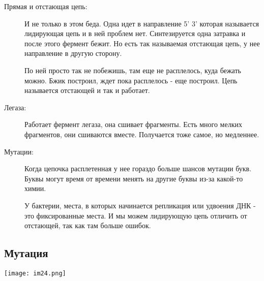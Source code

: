 \begin{description}
\item[Прямая и отстающая цепь:]
И не только в этом беда. Одна идет в направление 5' 3' которая называется лидирующая цепь и 
в ней проблем нет. Синтезируется одна затравка и после этого 
фермент бежит. Но есть так называемая отстающая цепь, у нее направление в другую сторону. 

По ней просто так не побежишь, там еще не расплелось, куда бежать можно. Бжик построил, 
ждет пока расплелось - еще построил. Цепь называется отстающей и так и работает. 

\item[Легаза:]

Работает фермент легаза, она сшивает фрагменты. Есть много мелких фрагментов, они 
сшиваются вместе. Получается тоже самое, но медленнее. 

\item[Мутации:]
Когда цепочка расплетенная у нее гораздо больше шансов мутации букв. Буквы могут время от времени 
менять на другие буквы из-за какой-то химии. 

У бактерии, места, в которых начинается репликация или удвоения ДНК - это 
фиксированные места. И мы можем лидирующую цепь отличить от отстающей, 
так как там больше ошибок.
\end{description}

\subsection{Мутация}
\texttt{[image: im24.png]}

